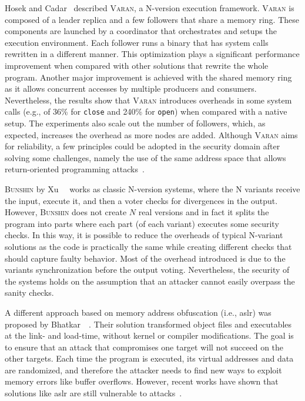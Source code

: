 Hosek and Cadar~\cite{Hosek:2015} described \textsc{Varan}, a N-version execution framework.
\textsc{Varan} is composed of a leader replica and a few followers that share a memory ring.
These components are launched by a coordinator that orchestrates and setups the execution environment.
Each follower runs a binary that has system calls rewritten in a different manner.
This optimization plays a significant performance improvement when compared with other solutions that rewrite the whole program.
Another major improvement is achieved with the shared memory ring as it allows concurrent accesses by multiple producers and consumers.
Nevertheless, the results show that \textsc{Varan} introduces overheads in some system calls (e.g., of 36\% for \texttt{close} and 240\% for \texttt{open}) when compared with a native setup.
The experiments also scale out the number of followers, which, as expected, increases the overhead as more nodes are added. 
Although \textsc{Varan} aims for reliability, a few principles could be adopted in the security domain after solving some challenges, namely the use of the same address space that allows return-oriented programming attacks~\cite{Snow:2013,Bittau:2014}.

\textsc{Bunshin} by Xu~\etal{}~\cite{Xu:2017c} works as classic N-version systems, where the N variants receive the input, execute it, and then a voter checks for divergences in the output.
However, \textsc{Bunshin} does not create $N$ real versions and in fact it splits the program into parts where each part (of each variant) executes some security checks. 
In this way, it is possible to reduce the overheads of typical N-variant solutions as the code is practically the same while creating different checks that should capture faulty behavior.
Most of the overhead introduced is due to the variants synchronization before the output voting.
Nevertheless, the security of the systems holds on the assumption that an attacker cannot easily overpass the sanity checks.


A different approach based on memory address obfuscation (i.e., \gls{aslr}) was proposed by Bhatkar~\etal{}~\cite{Bhatkar:2003}.
Their solution transformed object files and executables at the link- and load-time, without kernel or compiler modifications. 
The goal is to ensure that an attack that compromises one target will not succeed on the other targets. 
Each time the program is executed, its virtual addresses and data are randomized, and therefore the attacker needs to find new ways to exploit memory errors like buffer overflows. 
However, recent works have shown that solutions like \gls{aslr} are still vulnerable to attacks~\cite{Bittau:2014,Jang:2016,Snow:2013,vanderVeen:2017}.

